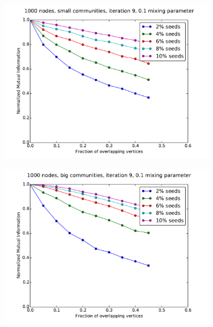 \begin{figure}
    \centering
    \begin{subfigure}{0.5\textwidth}
    \includegraphics[width=\linewidth]{allplots/overlap_iter_1mu_a.pdf}
    \end{subfigure}%
    \begin{subfigure}{0.5\textwidth}
    \includegraphics[width=\linewidth]{allplots/overlap_iter_1mu_b.pdf}
    \end{subfigure}
    \begin{subfigure}{0.5\textwidth}

\end{subfigure}
\end{figure}
